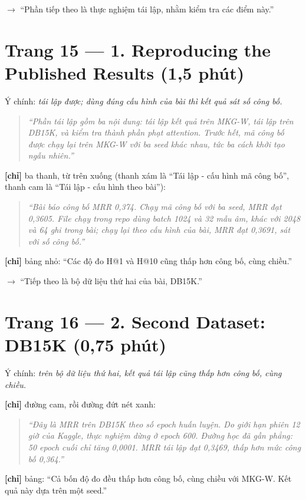 \documentclass[11pt,a4paper]{article}
\begin{document}
\textbf{$\to$} ``Phần tiếp theo là thực nghiệm tái lập, nhằm kiểm tra các điểm này.''


\section*{Trang 15 --- 1. Reproducing the Published Results (1,5 phút)}

Ý chính: \emph{tái lập được; dùng đúng cấu hình của bài thì kết quả sát số công bố.}


\begin{quote}\itshape ``Phần tái lập gồm ba nội dung: tái lập kết quả trên MKG-W, tái lập trên DB15K, và kiểm tra thành phần phạt attention. Trước hết, mã công bố được chạy lại trên MKG-W với ba seed khác nhau, tức ba cách khởi tạo ngẫu nhiên.''\end{quote}

\textbf{[chỉ]} ba thanh, từ trên xuống (thanh xám là ``Tái lập - cấu hình mã công bố'', thanh cam là ``Tái lập - cấu hình theo bài''):


\begin{quote}\itshape ``Bài báo công bố MRR 0,374. Chạy mã công bố với ba seed, MRR đạt 0,3605. File chạy trong repo dùng batch 1024 và 32 mẫu âm, khác với 2048 và 64 ghi trong bài; chạy lại theo cấu hình của bài, MRR đạt 0,3691, sát với số công bố.''\end{quote}

\textbf{[chỉ]} bảng nhỏ: ``Các độ đo H@1 và H@10 cũng thấp hơn công bố, cùng chiều.''


\textbf{$\to$} ``Tiếp theo là bộ dữ liệu thứ hai của bài, DB15K.''


\section*{Trang 16 --- 2. Second Dataset: DB15K (0,75 phút)}

Ý chính: \emph{trên bộ dữ liệu thứ hai, kết quả tái lập cũng thấp hơn công bố, cùng chiều.}


\textbf{[chỉ]} đường cam, rồi đường đứt nét xanh:


\begin{quote}\itshape ``Đây là MRR trên DB15K theo số epoch huấn luyện. Do giới hạn phiên 12 giờ của Kaggle, thực nghiệm dừng ở epoch 600. Đường học đã gần phẳng: 50 epoch cuối chỉ tăng 0,0001. MRR tái lập đạt 0,3469, thấp hơn mức công bố 0,364.''\end{quote}

\textbf{[chỉ]} bảng: ``Cả bốn độ đo đều thấp hơn công bố, cùng chiều với MKG-W. Kết quả này dựa trên một seed.''
\end{document}

